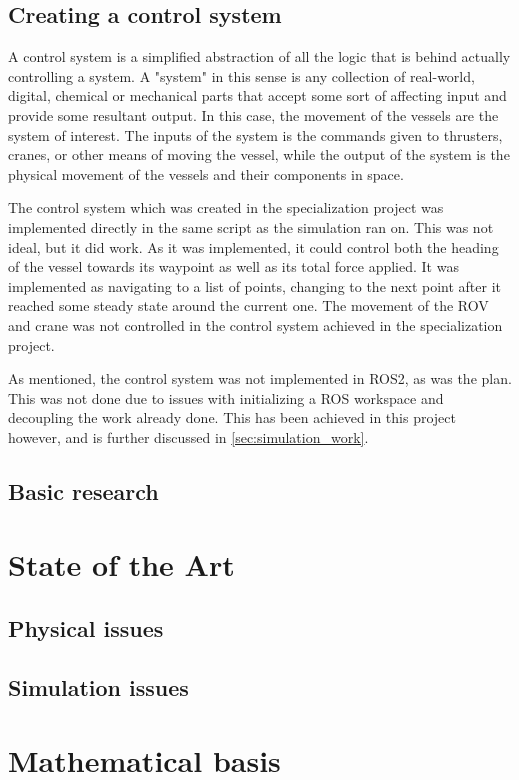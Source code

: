 \documentclass[class=article, crop=false, draft=true]{standalone}
\begin{document}
\subsection{Creating a control system}
A control system is a simplified abstraction of all the logic that is behind actually controlling a system. A "system" in this sense is any collection of real-world, digital, chemical or mechanical parts that accept some sort of affecting input and provide some resultant output. In this case, the movement of the vessels are the system of interest. The inputs of the system is the commands given to thrusters, cranes, or other means of moving the vessel, while the output of the system is the physical movement of the vessels and their components in space.

The control system which was created in the specialization project was implemented directly in the same script as the simulation ran on. This was not ideal, but it did work. As it was implemented, it could control both the heading of the vessel towards its waypoint as well as its total force applied. It was implemented as navigating to a list of points, changing to the next point after it reached some steady state around the current one. The movement of the ROV and crane was not controlled in the control system achieved in the specialization project.

As mentioned, the control system was not implemented in ROS2, as was the plan. This was not done due to issues with initializing a ROS workspace and decoupling the work already done. This has been achieved in this project however, and is further discussed in \cref{sec:simulation_work}.

\subsection{Basic research}

\section{State of the Art}
\subsection{Physical issues}
\subsection{Simulation issues}

\section{Mathematical basis}
\end{document}
